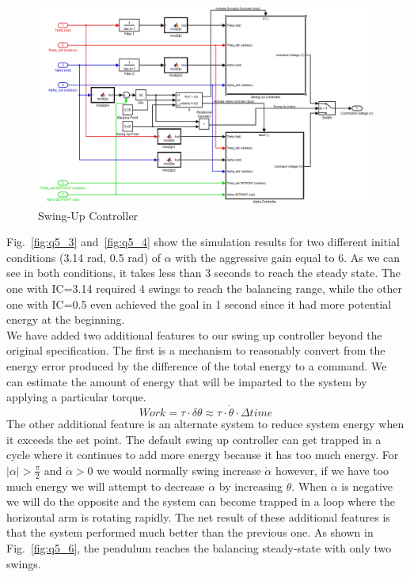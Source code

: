 \documentclass{article}
\theoremstyle{plain}
\theoremstyle{definition}
\theoremstyle{remark}
\begin{document}
\begin{figure}[h!]
\includegraphics[width=1\textwidth]{q5_2.png}
\caption{Swing-Up Controller} \label{tex}
\label{fig:q5_2}
\end{figure}

Fig.~\ref{fig:q5_3} and~\ref{fig:q5_4} show the simulation results for two different initial conditions (3.14 rad, 0.5 rad) of $\alpha$ with the aggressive gain equal to 6. As we can see in both conditions, it takes less than 3 seconds to reach the steady state. The one with IC=3.14 required 4 swings to reach the balancing range, while the other one with IC=0.5 even achieved the goal in 1 second since it had more potential energy at the beginning.\\

We have added two additional features to our swing up controller beyond the original specification.  The first is a mechanism to reasonably convert from the energy error produced by the difference of the total energy to a command.  We can estimate the amount of energy that will be imparted to the system by applying a particular torque.  
$$ Work = \tau \cdot \delta \theta \approx \tau \cdot \dot{\theta} \cdot \Delta time $$
The other additional feature is an alternate system to reduce system energy when it exceeds the set point.  The default swing up controller can get trapped in a cycle where it continues to add more energy because it has too much energy.  For $|\alpha| > \frac{\pi}{2}$ and $\dot{\alpha} > 0$ we would normally swing increase $\dot{\alpha}$ however, if we have too much energy we will attempt to decrease $\dot{\alpha}$ by increasing $\dot{\theta}$.  When $\dot{\alpha}$ is negative we will do the opposite and the system can become trapped in a loop where the horizontal arm is rotating rapidly.  
The net result of these additional features is that the system performed much better than the previous one. As shown in Fig.~\ref{fig:q5_6}, the pendulum reaches the balancing steady-state with only two swings.       
\end{document}
